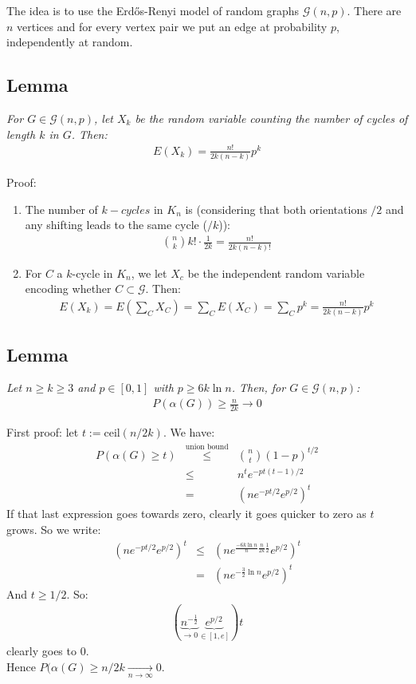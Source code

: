 The idea is to use the Erdős-Renyi model of random graphs $\mathcal{G}(n,p)$. There are $n$ vertices and for every vertex pair we put an edge at probability $p$, independently at random.

\subsection{Lemma}
\textit{For $G \in \mathcal{G}(n,p)$, let $X_k$ be the random variable counting the number of cycles of length $k$ in $G$. Then:}
\begin{eqnarray}
	E(X_k) = \frac{n!}{2k(n-k)} p^k
\end{eqnarray}

Proof:
\begin{enumerate}
	\item The number of $k-cycles$ in $K_n$ is (considering that both orientations $/2$ and any shifting leads to the same cycle ($/k$)):
	\begin{eqnarray}
		{{n}\choose{k}} k! \cdot \frac{1}{2k} = \frac{n!}{2k(n-k)!}
	\end{eqnarray}
	\item For $C$ a $k$-cycle in $K_n$, we let $X_c$ be the independent random variable encoding whether $C \subset \mathcal{G}$. Then:
	\begin{eqnarray}
		E(X_k) = E(\sum_C X_C) = \sum_C E(X_C) = \sum_C p^k = \frac{n!}{2k(n-k)} p^k
	\end{eqnarray}
\end{enumerate}

\subsection{Lemma}
\textit{Let $n \geq k \geq 3$ and $p \in [0,1]$ with $p \geq 6k \ln n$. Then, for $G \in \mathcal{G}(n,p)$:}
\begin{eqnarray}
	P(\alpha(G)) \geq \frac{n}{2k} \rightarrow 0
\end{eqnarray}

First proof: let $t := \text{ceil}(n/2k)$. We have:
\begin{eqnarray}
	P(\alpha(G) \geq t) &\overset{\text{union bound}}\leq& {{n}\choose{t}} (1 - p)^{t/2} \\
	&\leq& n^t e^{-pt(t-1)/2} \\
	&=& (ne^{-pt/2}e^{p/2})^t
\end{eqnarray}
If that last expression goes towards zero, clearly it goes quicker to zero as $t$ grows. So we write:
\begin{eqnarray}
	(ne^{-pt/2}e^{p/2})^t &\leq& (ne^{\frac{-6k\ln n}{n} \frac{n}{2k} \frac{1}{2}} e^{p/2})^t \\
	&=& (ne^{-\frac{3}{2} \ln n} e^{p/2})^t
\end{eqnarray}
And $t \geq 1/2$. So:
\begin{eqnarray}
	(\underbrace{n^{-\frac{1}{2}}}_{\rightarrow 0}  \underbrace{e^{p/2}}_{\in [1,e]})t
\end{eqnarray}
clearly goes to 0.\\
Hence $P(\alpha(G) \geq n/2k \underset{n \rightarrow \infty}\rightarrow 0$.\\

